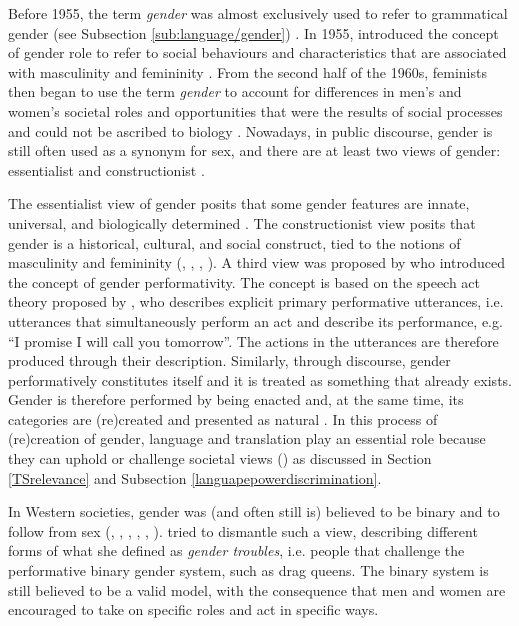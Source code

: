 Before 1955, the term \textit{gender} was almost exclusively used to refer to grammatical gender (see Subsection \ref{sub:language/gender}) \citep[89]{haig2004inexorable}. In 1955, \textcite{money1955hermaphroditism} introduced the concept of gender role to refer to social behaviours and characteristics that are associated with masculinity and femininity \citep[89]{haig2004inexorable}. From the second half of the 1960s, feminists then began to use the term \textit{gender} to account for differences in men's and women's societal roles and opportunities that were the results of social processes and could not be ascribed to biology \citep[5]{von2016translation}. Nowadays, in public discourse, gender is still often used as a synonym for sex, and there are at least two views of gender: essentialist and constructionist \citep[106]{acanfora2021in}.

The essentialist view of gender posits that some gender features are innate, universal, and biologically determined \citep[106]{acanfora2021in}. The constructionist view posits that gender is a historical, cultural, and social construct,
tied to the notions of masculinity and femininity (\cite[122]{barker2018rewriting}, \cite[32]{barker2018psychology}, \cite[56]{barker2019life}, \cite[106--107]{acanfora2021in}). A third view was proposed by \textcite[25]{butler1990gender} who introduced the concept of gender performativity. The concept is based on the speech act theory proposed by \textcite{austin1975things}, who describes explicit primary performative utterances, i.e. utterances that simultaneously perform an act and describe its performance, e.g. ``I promise I will call you tomorrow''. The actions in the utterances are therefore produced through their description. Similarly, through discourse, gender performatively constitutes itself and it is treated as something that already exists. Gender is therefore performed by being enacted and, at the same time, its categories are (re)created and presented as natural \citep[25]{butler1990gender}. In this process of (re)creation of gender, language and translation play an essential role because they can uphold or challenge societal views (\cite{simon1996gender,sprachhandeln2015tun,fairclough2015language}) as discussed in Section \ref{TSrelevance} and Subsection \ref{languapepowerdiscrimination}.


In Western societies, gender was (and often still is) believed to be binary and to follow from sex (\cite[95]{richards2016non}, \cite[116--117]{matsuno2017non}, \cite[122]{barker2018rewriting}, \cite[28]{barker2018psychology}, \cite{lester2018trans}, \cite[56--57]{barker2019life}). \textcite[174]{butler1990gender} tried to dismantle such a view, describing different forms of what she defined as \textit{gender troubles}, i.e. people that challenge the performative binary gender system, such as drag queens. The binary system is still believed to be a valid model, with the consequence that men and women are encouraged to take on specific roles and act in specific ways.

